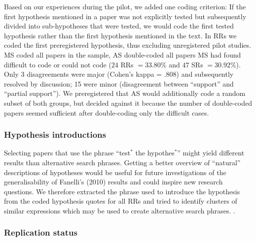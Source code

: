 \documentclass[british,,man,floatsintext]{apa6}
\begin{document}
Based on our experiences during the pilot, we added one coding criterion:
If the first hypothesis mentioned in a paper was not explicitly tested but subsequently divided into sub-hypotheses that were tested, we would code the first tested hypothesis rather than the first hypothesis mentioned in the text.
In RRs we coded the first preregistered hypothesis, thus excluding unregistered pilot studies.
MS coded all papers in the sample, AS double-coded all papers MS had found difficult to code or could not code (\(24\) RRs \(= 33.80\%\) and \(47\) SRs \(= 30.92 \%\)).
Only 3 disagreements were major (Cohen's kappa = .808) and subsequently resolved by discussion; 15 were minor (disagreement between \enquote{support} and \enquote{partial support}).
We preregistered that AS would additionally code a random subset of both groups, but decided against it because the number of double-coded papers seemed sufficient after double-coding only the difficult cases.

\hypertarget{hypothesis-introductions}{%
\subsubsection{Hypothesis introductions}\label{hypothesis-introductions}}

Selecting papers that use the phrase \enquote{test\(^\ast\) the hypothes\(^\ast\)} might yield different results than alternative search phrases.
Getting a better overview of \enquote{natural} descriptions of hypotheses would be useful for future investigations of the generalisability of Fanelli's (2010) results and could inspire new research questions.
We therefore extracted the phrase used to introduce the hypothesis from the coded hypothesis quotes for all RRs and tried to identify clusters of similar expressions which may be used to create alternative search phrases. .

\hypertarget{replication-status}{%
\subsubsection{Replication status}\label{replication-status}}
\end{document}
